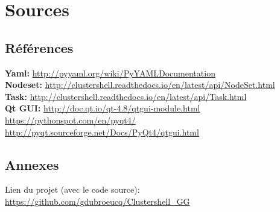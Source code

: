 \documentclass[a4paper,11pt]{article}
\begin{document}
\section{Sources}
\label{sec:section6}
\subsection{Références}
\noindent
\textbf{Yaml:} \url{http://pyyaml.org/wiki/PyYAMLDocumentation}\\
\noindent\textbf{Nodeset:} \url{http://clustershell.readthedocs.io/en/latest/api/NodeSet.html}\\
\textbf{Task:} \url{http://clustershell.readthedocs.io/en/latest/api/Task.html}\\
\textbf{Qt GUI:} \url {http://doc.qt.io/qt-4.8/qtgui-module.html}\\
\url {https://pythonspot.com/en/pyqt4/}\\
\url {http://pyqt.sourceforge.net/Docs/PyQt4/qtgui.html} 


\subsection{Annexes}
\noindent
Lien du projet (avec le code source):
\smallbreak
\url{https://github.com/gdubroeucq/Clustershell_GG}
\end{document}

